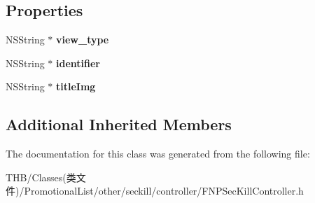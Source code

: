 \subsection*{Properties}
\begin{DoxyCompactItemize}
\item 
\mbox{\label{interface_f_n_p_sec_kill_controller_ab2357a4f833bab626f21c66d4c910fda}} 
N\+S\+String $\ast$ {\bfseries view\+\_\+type}
\item 
\mbox{\label{interface_f_n_p_sec_kill_controller_ac1842cb2a9de7087b4a3bde2b35508ac}} 
N\+S\+String $\ast$ {\bfseries identifier}
\item 
\mbox{\label{interface_f_n_p_sec_kill_controller_a83b6e875d682435237ff807976f178d7}} 
N\+S\+String $\ast$ {\bfseries title\+Img}
\end{DoxyCompactItemize}
\subsection*{Additional Inherited Members}


The documentation for this class was generated from the following file\+:\begin{DoxyCompactItemize}
\item 
T\+H\+B/\+Classes(类文件)/\+Promotional\+List/other/seckill/controller/F\+N\+P\+Sec\+Kill\+Controller.\+h\end{DoxyCompactItemize}
